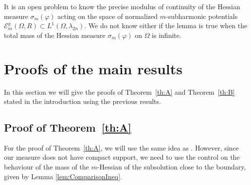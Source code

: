 \documentclass[JEP,XML,SOM,Unicode]{cedram}
\theoremstyle{definition}
\begin{document}
It is an open problem to know the precise modulus of continuity of the Hessian measure $\sigma_m (\varphi)$ acting on the space of normalized $m$-subharmonic potentials $\mathcal{E}^g_m(\Omega,R) \subset L^1 (\Omega,\lambda_{2 n})$. We do not know either if the lemma is true when the total mass of the Hessian measure $\sigma_m (\varphi) $ on $\Omega$ is infinite.

\section{Proofs of the main results}\label{sec:5}

In this section we will give the proofs of Theorem~\ref{th:A} and Theorem~\ref{th:B} stated in the introduction using the previous results.

\subsection{ Proof of Theorem~\ref{th:A}}

For the proof of Theorem~\ref{th:A}, we will use the same idea as \cite{KN19}. However, since our measure does not have compact support, we need to use the control on the behaviour of the mass of the $m$-Hessian of the subsolution close to the boundary, given by Lemma \ref{lem:ComparisonIneq}.
\end{document}
